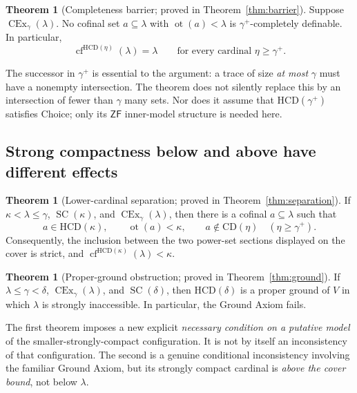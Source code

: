 \documentclass[11pt,letterpaper]{article}
\theoremstyle{definition}
\newtheorem{theorem}[definition]{Theorem}
\newcommand{\ZF}{\mathsf{ZF}}
\newcommand{\SC}{\operatorname{SC}}
\newcommand{\CEx}{\operatorname{CEx}}
\newcommand{\cf}{\operatorname{cf}}
\newcommand{\ot}{\operatorname{ot}}
\newcommand{\CD}{\mathrm{CD}}
\newcommand{\HCD}{\mathrm{HCD}}
\begin{document}
\begin{theorem}[Completeness barrier; proved in Theorem~\ref{thm:barrier}]\label{thm:overviewbarrier}
Suppose $\CEx_\gamma(\lambda)$. No cofinal set $a\subseteq\lambda$ with $\ot(a)<\lambda$ is $\gamma^+$-completely definable. In particular,
\begin{equation}\label{eq:overviewbarrier}
  \cf^{\HCD(\eta)}(\lambda)=\lambda
  \qquad\text{for every cardinal }\eta\geq\gamma^+.
\end{equation}
\end{theorem}

The successor in $\gamma^+$ is essential to the argument: a trace of size \emph{at most} $\gamma$ must have a nonempty intersection. The theorem does not silently replace this by an intersection of fewer than $\gamma$ many sets. Nor does it assume that $\HCD(\gamma^+)$ satisfies Choice; only its $\ZF$ inner-model structure is needed here.

\subsection{Strong compactness below and above have different effects}

\begin{theorem}[Lower-cardinal separation; proved in Theorem~\ref{thm:separation}]\label{thm:overviewlower}
If $\kappa<\lambda\leq\gamma$, $\SC(\kappa)$, and $\CEx_\gamma(\lambda)$, then there is a cofinal $a\subseteq\lambda$ such that
\[
 a\in\HCD(\kappa),\qquad \ot(a)<\kappa,
 \qquad a\notin\CD(\eta)\quad(\eta\geq\gamma^+).
\]
Consequently, the inclusion between the two power-set sections displayed on the cover is strict, and $\cf^{\HCD(\kappa)}(\lambda)<\kappa$.
\end{theorem}

\begin{theorem}[Proper-ground obstruction; proved in Theorem~\ref{thm:ground}]\label{thm:overviewupper}
If $\lambda\leq\gamma<\delta$, $\CEx_\gamma(\lambda)$, and $\SC(\delta)$, then $\HCD(\delta)$ is a proper ground of $V$ in which $\lambda$ is strongly inaccessible. In particular, the Ground Axiom fails.
\end{theorem}

The first theorem imposes a new explicit \emph{necessary condition on a putative model} of the smaller-strongly-compact configuration. It is not by itself an inconsistency of that configuration. The second is a genuine conditional inconsistency involving the familiar Ground Axiom, but its strongly compact cardinal is \emph{above the cover bound}, not below $\lambda$.
\end{document}
